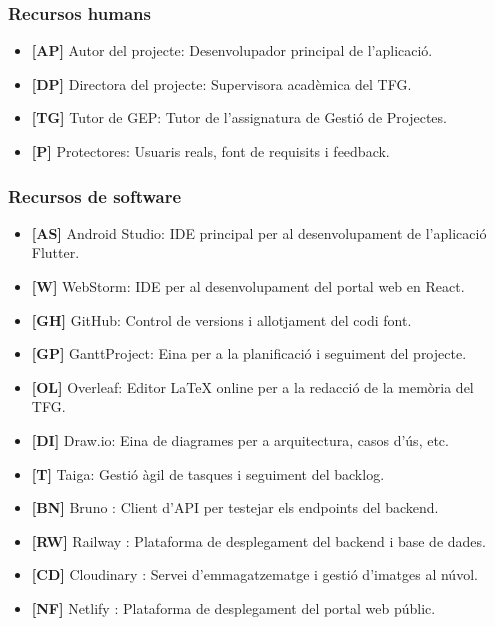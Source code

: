 \documentclass[11pt,a4paper]{report}
\begin{document}
\subsubsection{Recursos humans}
\begin{itemize}
    \item \textbf{[AP]} Autor del projecte: Desenvolupador principal de l'aplicació.
    \item \textbf{[DP]} Directora del projecte: Supervisora acadèmica del TFG.
    \item \textbf{[TG]} Tutor de GEP: Tutor de l'assignatura de Gestió de Projectes.
    \item \textbf{[P]} Protectores: Usuaris reals, font de requisits i feedback.
\end{itemize}

\subsubsection{Recursos de software}
\begin{itemize}
    \item \textbf{[AS]} Android Studio: IDE principal per al desenvolupament de l'aplicació Flutter.
    \item \textbf{[W]} WebStorm: IDE per al desenvolupament del portal web en React.
    \item \textbf{[GH]} GitHub: Control de versions i allotjament del codi font.
    \item \textbf{[GP]} GanttProject: Eina per a la planificació i seguiment del projecte.
    \item \textbf{[OL]} Overleaf: Editor \LaTeX{} online per a la redacció de la memòria del TFG.
    \item \textbf{[DI]} Draw.io: Eina de diagrames per a arquitectura, casos d'ús, etc.
    \item \textbf{[T]} Taiga: Gestió àgil de tasques i seguiment del backlog.
    \item \textbf{[BN]} Bruno \cite{bruno_bruno_nodate}: Client d'API per testejar els endpoints del backend.
    \item \textbf{[RW]} Railway \cite{railway_railway_nodate}: Plataforma de desplegament del backend i base de dades.
    \item \textbf{[CD]} Cloudinary \cite{cloudinary_cloudinary_nodate}: Servei d'emmagatzematge i gestió d'imatges al núvol.
    \item \textbf{[NF]} Netlify \cite{netlify_netlify_nodate}: Plataforma de desplegament del portal web públic.
\end{itemize}
\end{document}
